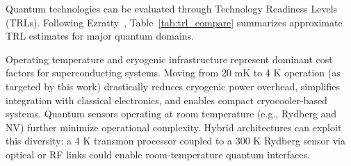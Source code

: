 Quantum technologies can be evaluated through Technology Readiness Levels (TRLs). Following Ezratty~\cite{Ezratty2024}, Table~\ref{tab:trl_compare} summarizes approximate TRL estimates for major quantum domains.

\begin{table}[h!]
\centering
\caption{Estimated TRL and scalability outlook of major quantum technologies.}
\label{tab:trl_compare}
\end{table}

Operating temperature and cryogenic infrastructure represent dominant cost factors for superconducting systems. Moving from 20 mK to 4 K operation (as targeted by this work) drastically reduces cryogenic power overhead, simplifies integration with classical electronics, and enables compact cryocooler-based systems. Quantum sensors operating at room temperature (e.g., Rydberg and NV) further minimize operational complexity. Hybrid architectures can exploit this diversity: a 4 K transmon processor coupled to a 300 K Rydberg sensor via optical or RF links could enable room-temperature quantum interfaces.

